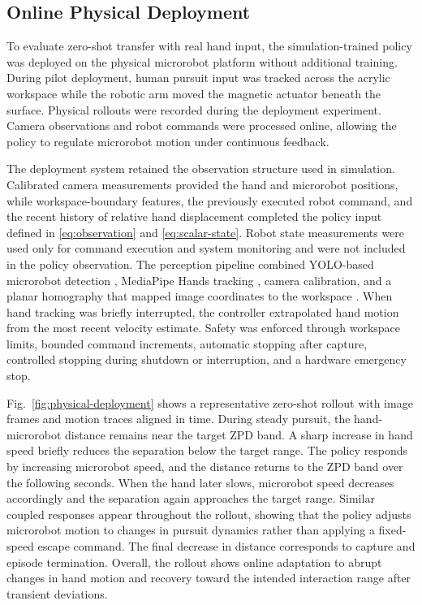 \documentclass[lettersize,journal]{IEEEtran}
\begin{document}
\subsection{Online Physical Deployment}
\label{subsec:physical-deployment}
To evaluate zero-shot transfer with real hand input, the simulation-trained policy was deployed on the physical microrobot platform without additional training. During pilot deployment, human pursuit input was tracked across the acrylic workspace while the robotic arm moved the magnetic actuator beneath the surface. Physical rollouts were recorded during the deployment experiment. Camera observations and robot commands were processed online, allowing the policy to regulate microrobot motion under continuous feedback.

The deployment system retained the observation structure used in simulation. Calibrated camera measurements provided the hand and microrobot positions, while workspace-boundary features, the previously executed robot command, and the recent history of relative hand displacement completed the policy input defined in \eqref{eq:observation} and \eqref{eq:scalar-state}. Robot state measurements were used only for command execution and system monitoring and were not included in the policy observation. The perception pipeline combined YOLO-based microrobot detection \cite{redmonYOLO2016}, MediaPipe Hands tracking \cite{zhangMediaPipeHands2020}, camera calibration, and a planar homography that mapped image coordinates to the workspace \cite{zhangCameraCalibration2000}. When hand tracking was briefly interrupted, the controller extrapolated hand motion from the most recent velocity estimate. Safety was enforced through workspace limits, bounded command increments, automatic stopping after capture, controlled stopping during shutdown or interruption, and a hardware emergency stop.

Fig.~\ref{fig:physical-deployment} shows a representative zero-shot rollout with image frames and motion traces aligned in time. During steady pursuit, the hand-microrobot distance remains near the target ZPD band. A sharp increase in hand speed briefly reduces the separation below the target range. The policy responds by increasing microrobot speed, and the distance returns to the ZPD band over the following seconds. When the hand later slows, microrobot speed decreases accordingly and the separation again approaches the target range. Similar coupled responses appear throughout the rollout, showing that the policy adjusts microrobot motion to changes in pursuit dynamics rather than applying a fixed-speed escape command. The final decrease in distance corresponds to capture and episode termination. Overall, the rollout shows online adaptation to abrupt changes in hand motion and recovery toward the intended interaction range after transient deviations.
\end{document}
